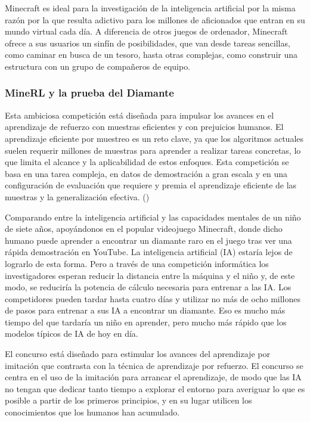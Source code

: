 Minecraft es ideal para la investigación de la inteligencia artificial por la misma razón por la que resulta adictivo para los millones de aficionados que entran en su mundo virtual cada día. A diferencia de otros juegos de ordenador, Minecraft ofrece a sus usuarios un sinfín de posibilidades, que van desde tareas sencillas, como caminar en busca de un tesoro, hasta otras complejas, como construir una estructura con un grupo de compañeros de equipo.

\subsubsection{MineRL y la prueba del Diamante}

Esta ambiciosa competición está diseñada para impulsar los avances en el aprendizaje de refuerzo con muestras eficientes y con prejuicios humanos. El aprendizaje eficiente por muestreo es un reto clave, ya que los algoritmos actuales suelen requerir millones de muestras para aprender a realizar tareas concretas, lo que limita el alcance y la aplicabilidad de estos enfoques. Esta competición se basa en una tarea compleja, en datos de demostración a gran escala y en una configuración de evaluación que requiere y premia el aprendizaje eficiente de las muestras y la generalización efectiva. (\cite{hofmann2019minecraft})

Comparando entre la inteligencia artificial y las capacidades mentales de un niño de siete años, apoyándonos en el popular videojuego Minecraft, donde dicho humano puede aprender a encontrar un diamante raro en el juego tras ver una rápida demostración en YouTube. La inteligencia artificial (IA) estaría lejos de lograrlo de esta forma. Pero a través de una competición informática los investigadores esperan reducir la distancia entre la máquina y el niño y, de este modo, se reduciría la potencia de cálculo necesaria para entrenar a las IA.
Los competidores pueden tardar hasta cuatro días y utilizar no más de ocho millones de pasos para entrenar a sus IA a encontrar un diamante. Eso es mucho más tiempo del que tardaría un niño en aprender, pero mucho más rápido que los modelos típicos de IA de hoy en día.

El concurso está diseñado para estimular los avances del aprendizaje por imitación que contrasta con la técnica de aprendizaje por refuerzo. El concurso se centra en el uso de la imitación para arrancar el aprendizaje, de modo que las IA no tengan que dedicar tanto tiempo a explorar el entorno para averiguar lo que es posible a partir de los primeros principios, y en su lugar utilicen los conocimientos que los humanos han acumulado. 

